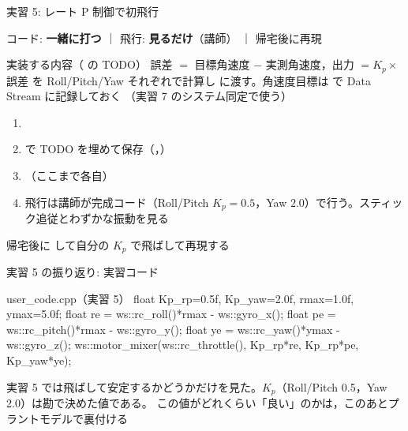 
\begin{frame}[fragile]{実習 5: レート P 制御で初飛行}
  \vspace{0.15em}

  {\footnotesize コード: \textcolor{sfblue}{\textbf{一緒に打つ}} ｜ 飛行: \textcolor{sfblue}{\textbf{見るだけ}}（講師） ｜ 帰宅後に再現}

  \vspace{0.3em}

  \begin{block}{実装する内容（ の TODO）}\footnotesize
    誤差 $=$ 目標角速度 $-$ 実測角速度，出力 $=K_p\times$誤差 を Roll/Pitch/Yaw
    それぞれで計算し  に渡す。角速度目標は
     で Data Stream に記録しておく
    （実習 7 のシステム同定で使う）
  \end{block}

  \begin{enumerate}\footnotesize\setlength{\itemsep}{0pt}
    \item {}
    \item {} で TODO を埋めて保存（，）
    \item {}（ここまで各自）
    \item 飛行は講師が完成コード（Roll/Pitch $K_p=0.5$，Yaw $2.0$）で行う。スティック追従とわずかな振動を見る
  \end{enumerate}

  {\footnotesize 帰宅後に  して自分の $K_p$ で飛ばして再現する}
\end{frame}

\begin{frame}[fragile]{実習 5 の振り返り: 実習コード}
  \begin{sflisting}[basicstyle=\ttfamily\scriptsize]{user\_code.cpp（実習 5）}
float Kp_rp=0.5f, Kp_yaw=2.0f, rmax=1.0f, ymax=5.0f;
float re = ws::rc_roll()*rmax  - ws::gyro_x();
float pe = ws::rc_pitch()*rmax - ws::gyro_y();
float ye = ws::rc_yaw()*ymax   - ws::gyro_z();
ws::motor_mixer(ws::rc_throttle(),
    Kp_rp*re, Kp_rp*pe, Kp_yaw*ye);
  \end{sflisting}

  \vspace{0.5em}

  {\footnotesize 実習 5 では飛ばして安定するかどうかだけを見た。$K_p$（Roll/Pitch 0.5，Yaw 2.0）は勘で決めた値である。
  この値がどれくらい「良い」のかは，このあとプラントモデルで裏付ける}
\end{frame}

